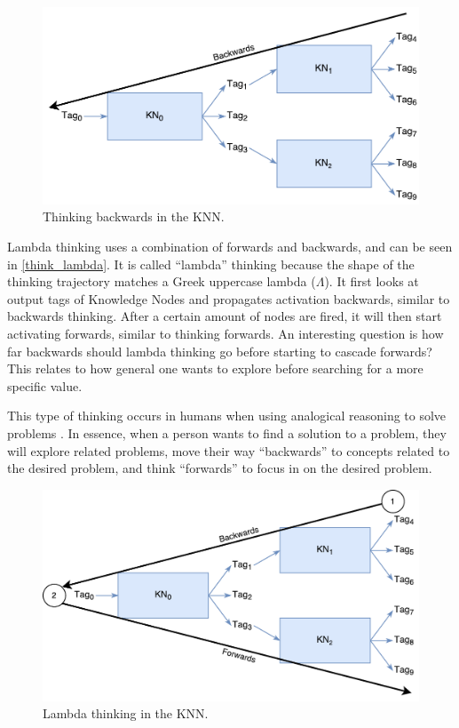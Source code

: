 \documentclass[titlepage,11pt]{article}
\begin{document}
\begin{figure}[!htb]
	\includegraphics[width=\columnwidth]{figures/backwards_thinking.pdf}
	\caption{Thinking backwards in the KNN.}
	\label{think_backwards}
\end{figure}

Lambda thinking uses a combination of forwards and backwards, and can be seen in \autoref{think_lambda}. It is called ``lambda'' thinking because the shape of the thinking trajectory matches a Greek uppercase lambda ($\Lambda$). It first looks at output tags of Knowledge Nodes and propagates activation backwards, similar to backwards thinking. After a certain amount of nodes are fired, it will then start activating forwards, similar to thinking forwards. An interesting question is how far backwards should lambda thinking go before starting to cascade forwards? This relates to how general one wants to explore before searching for a more specific value.

This type of thinking occurs in humans when using analogical reasoning to solve problems \cite{vybihal-lambda}. In essence, when a person wants to find a solution to a problem, they will explore related problems, move their way ``backwards'' to concepts related to the desired problem, and think ``forwards'' to focus in on the desired problem.

\begin{figure}[!htb]
\includegraphics[width=\columnwidth]{figures/lambda_thinking.pdf}
\caption{Lambda thinking in the KNN.}
\label{think_lambda}
\end{figure}
\end{document}
